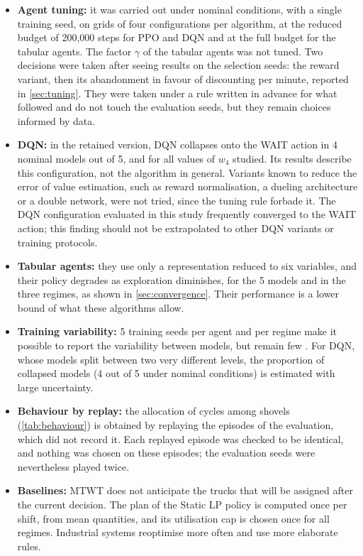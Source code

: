 \documentclass[11pt,a4paper]{article}
\newif\ifrevmarks
\newcommand{\revtag}[1]{\ifrevmarks\textsuperscript{\textcolor{red!70!black}{\scriptsize[#1]}}\fi}
\newenvironment{revbloc}[1]{\par\ifrevmarks\color{revcolor}\noindent\revtag{#1}\ \fi}{\par}
\newif\ifcorrmarks
\newcommand{\corr}[1]{\ifcorrmarks\textcolor{corrcolor}{#1}\else#1\fi}
\begin{document}
\begin{revbloc}{M7, M8, M9, M11, M12, M25, N1--N5, v3, T31}
\begin{itemize}
  \item \textbf{Agent tuning:} it was carried out under nominal conditions, with a single training seed, on grids of four configurations per algorithm, at the reduced budget of 200{,}000 steps for PPO and DQN and at the full budget for the tabular agents. The factor $\gamma$ of the tabular agents was not tuned. Two decisions were taken after seeing results on the selection seeds: the reward variant, then its abandonment in favour of discounting per minute, reported in \cref{sec:tuning}. They were taken under a rule written in advance for what followed and do not touch the evaluation seeds, but they remain choices informed by data.
  \item \textbf{DQN:} in the retained version, DQN collapses onto the WAIT action in 4 nominal models out of 5, and for all values of $w_4$ studied. Its results describe this configuration, not the algorithm in general. Variants known to reduce the error of value estimation, such as reward normalisation, a dueling architecture or a double network, were not tried, since the tuning rule forbade it. \corr{The DQN configuration evaluated in this study frequently converged to the WAIT action; this finding should not be extrapolated to other DQN variants or training protocols.}
  \item \textbf{Tabular agents:} they use only a representation reduced to six variables, and their policy degrades as exploration diminishes, for the 5 models and in the three regimes, as shown in \cref{sec:convergence}. Their performance is a lower bound of what these algorithms allow.
  \item \textbf{Training variability:} 5 training seeds per agent and per regime make it possible to report the variability between models, but remain few \cite{Henderson2018, Agarwal2021}. For DQN, whose models split between two very different levels, the proportion of collapsed models (4 out of 5 under nominal conditions) is estimated with large uncertainty.
  \item \textbf{Behaviour by replay:} the allocation of cycles among shovels (\cref{tab:behaviour}) is obtained by replaying the episodes of the evaluation, which did not record it. Each replayed episode was checked to be identical, and nothing was chosen on these episodes; the evaluation seeds were nevertheless played twice.
  \item \textbf{Baselines:} MTWT does not anticipate the trucks that will be assigned after the current decision. The plan of the \corr{Static LP} policy is computed once per shift, from mean quantities, and its utilisation cap is chosen once for all regimes. Industrial systems reoptimise more often and use more elaborate rules.

\end{itemize}
\end{revbloc}
\end{document}
